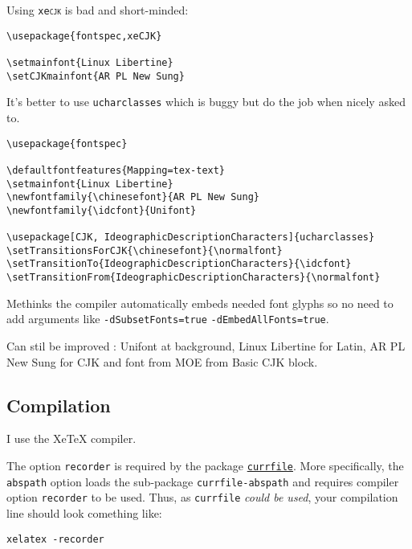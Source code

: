Using \texttt{xe\textsc{cjk}} is bad and short-minded:
\begin{lstlisting}
\usepackage{fontspec,xeCJK}

\setmainfont{Linux Libertine}
\setCJKmainfont{AR PL New Sung}
\end{lstlisting}

It's better to use \texttt{ucharclasses} which is buggy but do the job when nicely asked to.
\begin{lstlisting}
\usepackage{fontspec}

\defaultfontfeatures{Mapping=tex-text}
\setmainfont{Linux Libertine}
\newfontfamily{\chinesefont}{AR PL New Sung}
\newfontfamily{\idcfont}{Unifont}

\usepackage[CJK, IdeographicDescriptionCharacters]{ucharclasses}
\setTransitionsForCJK{\chinesefont}{\normalfont}
\setTransitionTo{IdeographicDescriptionCharacters}{\idcfont}
\setTransitionFrom{IdeographicDescriptionCharacters}{\normalfont}
\end{lstlisting}

Methinks the compiler automatically embeds needed font glyphs so no need to add arguments like \texttt{-dSubsetFonts=true} \texttt{-dEmbedAllFonts=true}.

Can stil be improved : Unifont at background, Linux Libertine for Latin, AR PL New Sung for CJK and font from MOE from Basic CJK block.

\subsection{Compilation}

I use the Xe\TeX{} compiler.

The option \texttt{recorder} is required by the package \href{http://www.ctan.org/tex-archive/macros/latex/contrib/currfile}{\texttt{currfile}}. More specifically, the \texttt{abspath} option loads the sub-package \texttt{currfile-abspath} and requires compiler option \texttt{recorder} to be used. Thus, as \texttt{currfile} \textsl{could be used}, your compilation line should look comething like:

\begin{lstlisting}
xelatex -recorder
\end{lstlisting}
